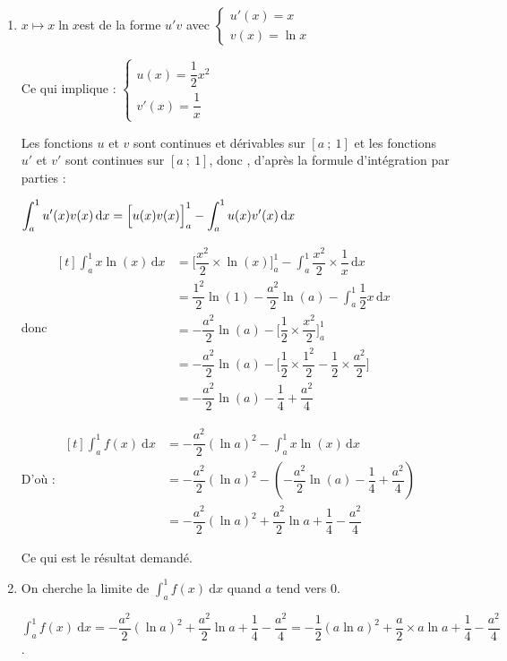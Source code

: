 \begin{enumerate}
\begin{enumerate}
	\item  $x \longmapsto x \ln x $\quad est de la forme $u' v$ avec \quad $\begin{cases}u'(x)=x\\ v(x)=\ln x \end{cases}$

Ce qui implique : \quad $\begin{cases}u(x)=\dfrac{1}{2}x^2\\v'(x)=\dfrac{1}{x}\end{cases}$

Les fonctions $u$ et $v$ sont continues et dérivables sur $[a~;~1]$ et les fonctions $u'$ et $v'$ sont continues sur $[a~;~1]$, donc , d'après la formule d'intégration par parties :

$\displaystyle \int_{a}^{1} u'(x)v(x)\, \mathrm{d}x = \Big [ u(x)v(x)\strut\Big]_{a}^{1} - \int_{a}^{1} u(x)v'(x) \, \mathrm{d}x$\

donc 
$\begin{aligned}[t]
\displaystyle\int_a^1 x \ln (x)\, \mathrm{d}x  & =\Big[ \dfrac{x^2}{2 }\times \ln (x)\Big]_a^{1}-\int_a^{1} \dfrac{x^2}{2} \times \dfrac{1}{x} \, \mathrm{d}x \\
	& =  \dfrac{1^2}{2} \ln (1)  - \dfrac{a^2}{2} \ln (a)  - \int_a^{1} \dfrac{1}{2}x \, \mathrm{d}x \\
	&= - \dfrac{a^2}{2} \ln (a)  - \Big[ \dfrac{1}{2} \times \dfrac{x^2}{2 }\Big]_a^{1}\\
	&= - \dfrac{a^2}{2} \ln (a)  - \Big[ \dfrac{1}{2} \times \dfrac{1^2}{2 } - \dfrac{1}{2} \times \dfrac{a^2}{2 }  \Big]\\
	&= - \dfrac{a^2}{2} \ln (a)  -  \dfrac{1}{4} +  \dfrac{a^2}{4 } 
\end{aligned}$

D'où :
$\begin{aligned}[t]
\displaystyle\int_a^1 f(x)\: \text{d}x & =  - \dfrac{a^2}{2} (\ln a)^2  - \int_a^{1} x \ln(x) \, \mathrm{d}x \\
	&= - \dfrac{a^2}{2}(\ln a)^2  - \left( - \dfrac{a^2}{2} \ln (a)  -  \dfrac{1}{4} +  \dfrac{a^2}{4 }  \right) \\
	&= - \dfrac{a^2}{2}(\ln a)^2 + \dfrac{a^2}{2} \ln a + \dfrac14 - \dfrac{a^2}{4}
		\end{aligned}$

Ce qui est le résultat demandé.
\item  On cherche  la limite de $\displaystyle\int_a^1 f(x)\: \text{d}x$ quand $a$ tend vers 0.

$\displaystyle\int_a^1 f(x)\: \text{d}x = - \dfrac{a^2}{2}(\ln a)^2 + \dfrac{a^2}{2} \ln a + \dfrac14 - \dfrac{a^2}{4} = - \dfrac{1}{2} \left(a \ln a\right)^2+ \dfrac{a}{2} \times  a \ln a + \dfrac{1}{4} - \dfrac{a^2}{4}$.


\end{enumerate}
\end{enumerate}
